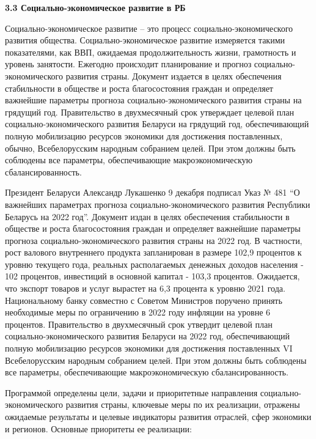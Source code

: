 \documentclass[14pt,a4paper]{article}
\begin{document}
    \begin{center}
        \textbf{3.3 Социально-экономическое развитие в РБ}
    \end{center}
    Социально-экономическое развитие – это процесс социально-экономического развития общества.
    Социально-экономическое развитие измеряется такими показателями, как ВВП, ожидаемая продолжительность жизни, грамотность и уровень занятости.
    Ежегодно происходит планирование и прогноз социально-экономического развития страны.
    Документ издается в целях обеспечения стабильности в обществе и роста благосостояния граждан и определяет важнейшие параметры прогноза социально-экономического развития страны на грядущий год.
    Правительство в двухмесячный срок утверждает целевой план социально-экономического развития Беларуси на грядущий год, обеспечивающий полную мобилизацию ресурсов экономики для достижения поставленных, обычно, Всебелорусским народным собранием целей.
    При этом должны быть соблюдены все параметры, обеспечивающие макроэкономическую сбалансированность.
    \par
    Президент Беларуси Александр Лукашенко 9 декабря подписал Указ № 481 ``О важнейших параметрах прогноза социально-экономического развития Республики Беларусь на 2022 год''.
    Документ издан в целях обеспечения стабильности в обществе и роста благосостояния граждан и определяет важнейшие параметры прогноза социально-экономического развития страны на 2022 год.
    В частности, рост валового внутреннего продукта запланирован в размере 102,9 процентов к уровню текущего года, реальных располагаемых денежных доходов населения - 102 процентов, инвестиций в основной капитал - 103,3 процентов.
    Ожидается, что экспорт товаров и услуг вырастет на 6,3 процента к уровню 2021 года.
    Национальному банку совместно с Советом Министров поручено принять необходимые меры по ограничению в 2022 году инфляции на уровне 6 процентов.
    Правительство в двухмесячный срок утвердит целевой план социально-экономического развития Беларуси на 2022 год, обеспечивающий полную мобилизацию ресурсов экономики для достижения поставленных VI Всебелорусским народным собранием целей.
    При этом должны быть соблюдены все параметры, обеспечивающие макроэкономическую сбалансированность.
    \par
    Программой определены цели, задачи и приоритетные направления социально-экономического развития страны, ключевые меры по их реализации, отражены ожидаемые результаты и целевые индикаторы развития отраслей, сфер экономики и регионов.
    Основные приоритеты ее реализации:
\end{document}
